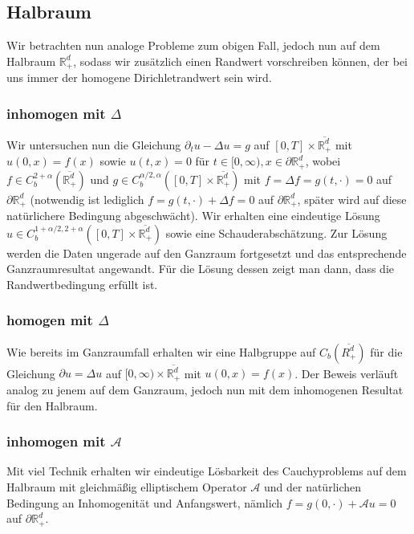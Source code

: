 \documentclass[11pt,a4paper]{scrartcl}
\newcommand{\R}{\mathbb{R}} %
\newcommand{\A}{\mathcal{A}}
\theoremstyle{plain}
\theoremstyle{definition}
\theoremstyle{remark}
\begin{document}
\subsection{Halbraum}

Wir betrachten nun analoge Probleme zum obigen Fall, jedoch nun auf dem Halbraum $\R^d_+$, sodass wir zusätzlich einen Randwert vorschreiben können, der bei uns immer der homogene Dirichletrandwert sein wird.

\subsubsection{inhomogen mit $\Delta$}

Wir untersuchen nun die Gleichung $\partial_t u - \Delta u = g$ auf $[0,T] \times \overline{\R^d_+}$ mit $u(0,x)=f(x)$ sowie $u(t,x)=0$ für $t\in [0,\infty), x\in \partial \R^d_+$, wobei $f\in C_b^{2+\alpha}(\overline{\R^d_+})$ und $g\in C_b^{\alpha/2, \alpha}([0,T] \times \overline{\R^d_+})$ mit $f=\Delta f = g(t,\cdot)=0$ auf $\partial \R^d_+$ (notwendig ist lediglich $f=g(t,\cdot)+\Delta f=0$ auf $\partial \R^d_+$, später wird auf diese natürlichere Bedingung abgeschwächt). Wir erhalten eine eindeutige Lösung $u\in C_b^{1+\alpha/2, 2+\alpha}([0,T]\times \overline{\R^d_+})$ sowie eine Schauderabschätzung. Zur Lösung werden die Daten ungerade auf den Ganzraum fortgesetzt und das entsprechende Ganzraumresultat angewandt. Für die Lösung dessen zeigt man dann, dass die Randwertbedingung erfüllt ist. 

\subsubsection{homogen mit $\Delta$}

Wie bereits im Ganzraumfall erhalten wir eine Halbgruppe auf $C_b(\overline{R^d_+})$ für die Gleichung $\partial u = \Delta u$ auf $[0,\infty) \times \overline{\R^d_+}$ mit $u(0,x)=f(x)$. Der Beweis verläuft analog zu jenem auf dem Ganzraum, jedoch nun mit dem inhomogenen Resultat für den Halbraum.

\subsubsection{inhomogen mit $\A$}

Mit viel Technik erhalten wir eindeutige Lösbarkeit des Cauchyproblems auf dem Halbraum mit gleichmäßig elliptischem Operator $\A$ und der natürlichen Bedingung an Inhomogenität und Anfangswert, nämlich $f=g(0,\cdot) + \A u=0$ auf $\partial \R^d_+$.
\end{document}
